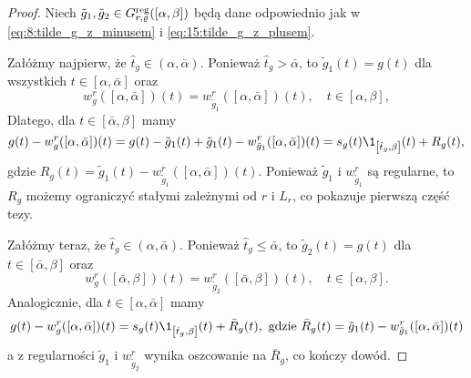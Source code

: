 \documentclass[oik, pdftex, robocza, man]{mgrwms}
\begin{document}
    \begin{proof}
        Niech $\tilde{g}_{1}, \tilde{g}_{2} \in G_{r, \varrho}^{\mathrm{reg}}([\alpha, \beta])$ będą dane odpowiednio jak w \eqref{eq:8:tilde_g_z_minusem} i \eqref{eq:15:tilde_g_z_plusem}.

        Załóżmy najpierw, że $\hat{t}_{g} \in (\alpha,\bar{\alpha})$.
        Ponieważ $\hat{t}_{g}>\bar{\alpha}$, to $\tilde{g}_{1}(t)=g(t)$ dla wszystkich $t \in[\alpha, \bar{\alpha}]$ oraz
        \begin{equation*}
            w_{g}^{r}([\alpha, \bar{\alpha}])(t)=w_{\tilde{g}_{1}}^{r}([\alpha, \bar{\alpha}])(t), \quad t \in[\alpha, \beta],
        \end{equation*}
        Dlatego, dla $t \in[\bar{\alpha}, \beta]$ mamy
        \begin{equation}
            g(t)-w_{g}^{r}([\alpha, \bar{\alpha}])(t)=g(t)-\tilde{g}_{1}(t)+\tilde{g}_{1}(t)-w_{\tilde{g}_{1}}^{r}([\alpha, \bar{\alpha}])(t)=s_{g}(t) \1_{\left[\hat{t}_{g}, \beta\right]}(t)+R_{g}(t),
        \end{equation}
        gdzie $R_{g}(t)=\tilde{g}_{1}(t)-w_{\tilde{g}_{1}}^{r}([\alpha, \bar{\alpha}])(t)$. Ponieważ $\tilde{g}_{1}$ i $w_{\tilde{g}_{1}}^{r}$ są regularne, to $R_{g}$ możemy ograniczyć stałymi zależnymi  od $r$ i $L_{r}$, co pokazuje pierwszą część tezy.

        Załóżmy teraz, że $\hat{t}_{g} \in (\alpha,\bar{\alpha})$.
        Ponieważ $\hat{t}_{g} \leq \bar{\alpha}$, to $\tilde{g}_{2}(t)=g(t)$ dla $t \in[\bar{\alpha}, \beta]$ oraz
        \begin{equation*}
            w_{g}^{r}([\bar{\alpha}, \beta])(t)=w_{\tilde{g}_{2}}^{r}([\bar{\alpha}, \beta])(t), \quad t \in[\alpha, \beta].
        \end{equation*}
        Analogicznie, dla $t \in [\alpha, \bar{\alpha}]$ mamy
        \begin{equation}
            g(t)-w_{g}^{r}([\alpha, \bar{\alpha}])(t)=s_{g}(t) \1_{\left[\hat{t}_{g}, \beta\right]}(t)+\bar{R}_{g}(t), \text{ gdzie } \bar{R}_{g}(t)=\tilde{g}_{1}(t)-w_{\tilde{g}_{1}}^{r}([\alpha, \bar{\alpha}])(t)
        \end{equation}
        a z regularności $\tilde{g}_{1}$ i $w_{\tilde{g}_{2}}^{r}$ wynika oszcowanie na $\bar{R}_{g}$, co kończy dowód.
    \end{proof}
\end{document}
